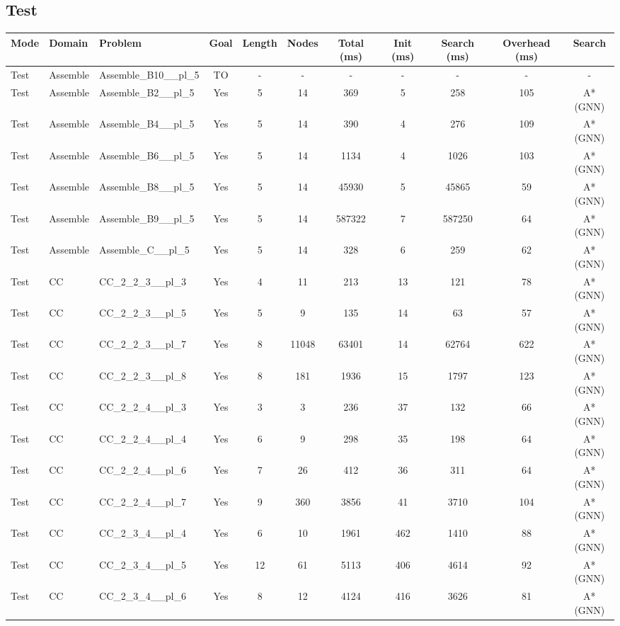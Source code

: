 \documentclass{article}
\begin{document}
\subsection*{Test}
\begin{tabular}{lllcccccccc}
\toprule
Mode & Domain & Problem & Goal & Length & Nodes & Total (ms) & Init (ms) & Search (ms) & Overhead (ms) & Search \\
\midrule
Test & Assemble & Assemble\_B10\_\_pl\_5 & TO & - & - & - & - & - & - & - \\
Test & Assemble & Assemble\_B2\_\_pl\_5 & Yes & 5 & 14 & 369 & 5 & 258 & 105 & A*(GNN) \\
Test & Assemble & Assemble\_B4\_\_pl\_5 & Yes & 5 & 14 & 390 & 4 & 276 & 109 & A*(GNN) \\
Test & Assemble & Assemble\_B6\_\_pl\_5 & Yes & 5 & 14 & 1134 & 4 & 1026 & 103 & A*(GNN) \\
Test & Assemble & Assemble\_B8\_\_pl\_5 & Yes & 5 & 14 & 45930 & 5 & 45865 & 59 & A*(GNN) \\
Test & Assemble & Assemble\_B9\_\_pl\_5 & Yes & 5 & 14 & 587322 & 7 & 587250 & 64 & A*(GNN) \\
Test & Assemble & Assemble\_C\_\_pl\_5 & Yes & 5 & 14 & 328 & 6 & 259 & 62 & A*(GNN) \\
Test & CC & CC\_2\_2\_3\_\_pl\_3 & Yes & 4 & 11 & 213 & 13 & 121 & 78 & A*(GNN) \\
Test & CC & CC\_2\_2\_3\_\_pl\_5 & Yes & 5 & 9 & 135 & 14 & 63 & 57 & A*(GNN) \\
Test & CC & CC\_2\_2\_3\_\_pl\_7 & Yes & 8 & 11048 & 63401 & 14 & 62764 & 622 & A*(GNN) \\
Test & CC & CC\_2\_2\_3\_\_pl\_8 & Yes & 8 & 181 & 1936 & 15 & 1797 & 123 & A*(GNN) \\
Test & CC & CC\_2\_2\_4\_\_pl\_3 & Yes & 3 & 3 & 236 & 37 & 132 & 66 & A*(GNN) \\
Test & CC & CC\_2\_2\_4\_\_pl\_4 & Yes & 6 & 9 & 298 & 35 & 198 & 64 & A*(GNN) \\
Test & CC & CC\_2\_2\_4\_\_pl\_6 & Yes & 7 & 26 & 412 & 36 & 311 & 64 & A*(GNN) \\
Test & CC & CC\_2\_2\_4\_\_pl\_7 & Yes & 9 & 360 & 3856 & 41 & 3710 & 104 & A*(GNN) \\
Test & CC & CC\_2\_3\_4\_\_pl\_4 & Yes & 6 & 10 & 1961 & 462 & 1410 & 88 & A*(GNN) \\
Test & CC & CC\_2\_3\_4\_\_pl\_5 & Yes & 12 & 61 & 5113 & 406 & 4614 & 92 & A*(GNN) \\
Test & CC & CC\_2\_3\_4\_\_pl\_6 & Yes & 8 & 12 & 4124 & 416 & 3626 & 81 & A*(GNN) \\

\end{tabular}
\end{document}
